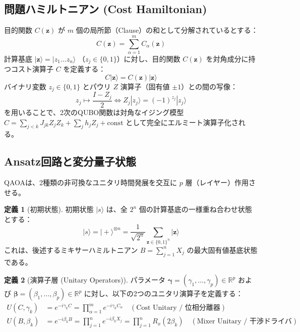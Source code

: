 \documentclass[11pt,a4paper]{ltjsarticle}
\theoremstyle{definition}
\newtheorem{definition}{定義}[section]
\theoremstyle{plain}
\theoremstyle{remark}
\newcommand{\ket}[1]{|#1\rangle}
\begin{document}
\subsection{問題ハミルトニアン (Cost Hamiltonian)}
目的関数 $C(\bm{z})$ が $m$ 個の局所節（Clause）の和として分解されているとする：
\begin{equation}
C(\bm{z}) = \sum_{\alpha=1}^m C_\alpha(\bm{z})
\end{equation}
計算基底 $\ket{\bm{z}} = \ket{z_1 \dots z_n}$ （$z_j \in \{0, 1\}$）に対し、目的関数 $C(\bm{z})$ を対角成分に持つコスト演算子 $C$ を定義する：
\begin{equation}
C \ket{\bm{z}} = C(\bm{z}) \ket{\bm{z}}
\end{equation}
バイナリ変数 $z_j \in \{0, 1\}$ とパウリ $Z$ 演算子（固有値 $\pm 1$）との間の写像：
\begin{equation}
z_j \mapsto \frac{I - Z_j}{2} \iff Z_j \ket{z_j} = (-1)^{z_j} \ket{z_j}
\end{equation}
を用いることで、2次のQUBO関数は対角なイジング模型 $C = \sum_{j < k} J_{jk} Z_j Z_k + \sum_j h_j Z_j + \text{const}$ として完全にエルミート演算子化される。

\subsection{Ansatz回路と変分量子状態}
QAOAは、2種類の非可換なユニタリ時間発展を交互に $p$ 層（レイヤー）作用させる。

\begin{definition}[初期状態]
初期状態 $\ket{s}$ は、全 $2^n$ 個の計算基底の一様重ね合わせ状態とする：
\begin{equation}
\ket{s} = \ket{+}^{\otimes n} = \frac{1}{\sqrt{2^n}} \sum_{\bm{z} \in \{0, 1\}^n} \ket{\bm{z}}
\end{equation}
これは、後述するミキサーハミルトニアン $B = \sum_{j=1}^n X_j$ の最大固有値基底状態である。
\end{definition}

\begin{definition}[演算子層 (Unitary Operators)]
パラメータ $\bm{\gamma} = (\gamma_1, \dots, \gamma_p) \in \mathbb{R}^p$ および $\bm{\beta} = (\beta_1, \dots, \beta_p) \in \mathbb{R}^p$ に対し、以下の2つのユニタリ演算子を定義する：
\begin{align}
U(C, \gamma_k) &= e^{-i \gamma_k C} = \prod_{\alpha=1}^m e^{-i \gamma_k C_\alpha} \quad (\text{Cost Unitary / 位相分離器}) \\
U(B, \beta_k) &= e^{-i \beta_k B} = \prod_{j=1}^n e^{-i \beta_k X_j} = \prod_{j=1}^n R_x(2\beta_k) \quad (\text{Mixer Unitary / 干渉ドライバ})
\end{align}
\end{definition}
\end{document}
